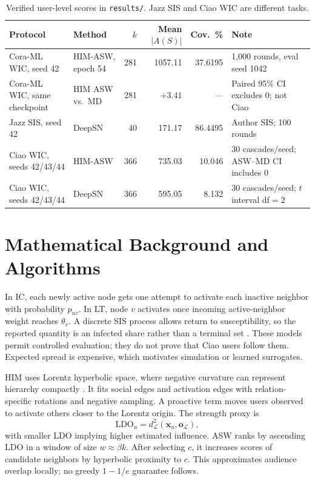 \documentclass[10pt,twocolumn]{article}
\begin{document}
\begin{table}[t]
\centering\scriptsize
\caption{Verified user-level scores in \texttt{results/}. Jazz SIS and Ciao WIC are different tasks.}
\label{tab:verified}
\begin{tabularx}{\textwidth}{@{}L{0.28\textwidth}L{0.20\textwidth}r r r X@{}}
\toprule
Protocol & Method & $k$ & Mean $|A(S)|$ & Cov.\ \% & Note \\
\midrule
Cora-ML WIC, seed 42 & HIM-ASW, epoch 54 & 281 & 1057.11 & 37.6195 & 1,000 rounds, eval seed 1042 \\
Cora-ML WIC, same checkpoint & HIM ASW vs.\ MD & 281 & $+3.41$ & --- & Paired 95\% CI excludes 0; not Ciao \\
Jazz SIS, seed 42 & DeepSN & 40 & 171.17 & 86.4495 & Author SIS; 100 rounds \\
Ciao WIC, seeds 42/43/44 & HIM-ASW & 366 & 735.03 & 10.046 & 30 cascades/seed; ASW--MD CI includes 0 \\
Ciao WIC, seeds 42/43/44 & DeepSN & 366 & 595.05 & 8.132 & 30 cascades/seed; $t$ interval df$=2$ \\
\bottomrule
\end{tabularx}
\end{table}

\section{Mathematical Background and Algorithms}
In IC, each newly active node gets one attempt to activate each inactive neighbor with probability $p_{uv}$. In LT, node $v$ activates once incoming active-neighbor weight reaches $\theta_v$. A discrete SIS process allows return to susceptibility, so the reported quantity is an infected share rather than a terminal set \cite{pastor}. These models permit controlled evaluation; they do not prove that Ciao users follow them. Expected spread is expensive, which motivates simulation or learned surrogates.

HIM uses Lorentz hyperbolic space, where negative curvature can represent hierarchy compactly \cite{poincare}. It fits social edges and activation edges with relation-specific rotations and negative sampling. A proactive term moves users observed to activate others closer to the Lorentz origin. The strength proxy is
\begin{equation}
\mathrm{LDO}_u=d_{\mathcal L}^{2}(\mathbf{x}_u,\mathbf{o}_{\mathcal L}),
\end{equation}
with smaller LDO implying higher estimated influence. ASW ranks by ascending LDO in a window of size $w\approx\beta k$. After selecting $c$, it increases scores of candidate neighbors by hyperbolic proximity to $c$. This approximates audience overlap locally; no greedy $1-1/e$ guarantee follows.
\end{document}
